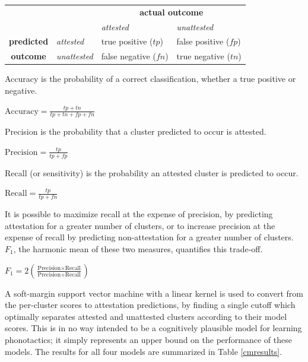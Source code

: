 \begin{example}
\begin{tabular}{c l | l l}
                   & & \multicolumn{2}{c}{\textbf{actual outcome}}            \\
                   & & \emph{attested}   & \emph{unattested}            \\
\midrule
\textbf{predicted} & \emph{attested}   & true positive ($tp$)  & false positive ($fp$) \\
\textbf{outcome}   & \emph{unattested} & false negative ($fn$) & true negative ($tn$)  \\
\end{tabular}
\end{example}

\noindent Accuracy is the probability of a correct classification, whether a true positive or negative.

\begin{unlabeledexample}
$\displaystyle \textrm{Accuracy} = \frac{tp + tn}{tp + tn + fp + fn}$
\end{unlabeledexample}

\noindent Precision is the probability that a cluster predicted to occur is attested.

\begin{unlabeledexample}
$\displaystyle \textrm{Precision} = \frac{tp}{tp + fp}$
\end{unlabeledexample}

\noindent Recall (or sensitivity) is the probability an attested cluster is predicted to occur.

\begin{unlabeledexample}
$\displaystyle \textrm{Recall} = \frac{tp}{tp + fn}$
\end{unlabeledexample}

\noindent It is possible to maximize recall at the expense of precision, by predicting attestation for a greater number of clusters, or to increase precision at the expense of recall by predicting non-attestation for a greater number of clusters. $F_1$, the harmonic mean of these two measures, quantifies this trade-off.

\begin{unlabeledexample}
$\displaystyle F_1 = 2 \left( \frac{\textrm{Precision} \times \textrm{Recall}}{\textrm{Precision} + \textrm{Recall}}\right)$
\end{unlabeledexample}

A soft-margin support vector machine \citep{Cortes1995} with a linear kernel is used to convert from the per-cluster scores to attestation predictions, by finding a single cutoff which optimally separates attested and unattested clusters according to their model scores. This is in no way intended to be a cognitively plausible model for learning phonotactics; it simply represents an upper bound on the performance of these models. The results for all four models are summarized in Table \ref{cmresults}.

